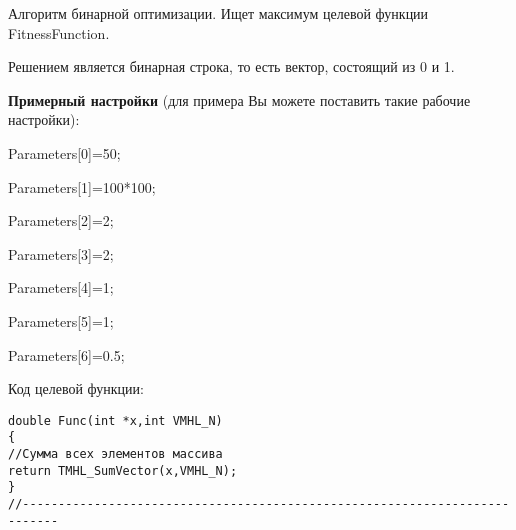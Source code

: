 Алгоритм бинарной оптимизации. Ищет максимум целевой функции FitnessFunction.

Решением является бинарная строка, то есть вектор, состоящий из 0 и 1.

\textbf{Примерный настройки} (для примера Вы можете поставить такие рабочие настройки):

 Parameters[0]=50;
 
Parameters[1]=100*100;

Parameters[2]=2;

Parameters[3]=2;

Parameters[4]=1;

Parameters[5]=1;

Parameters[6]=0.5;

Код целевой функции:
\begin{lstlisting}[caption=Оптимизируемая функция]
double Func(int *x,int VMHL_N)
{
//Сумма всех элементов массива
return TMHL_SumVector(x,VMHL_N);
}
//---------------------------------------------------------------------------
\end{lstlisting}